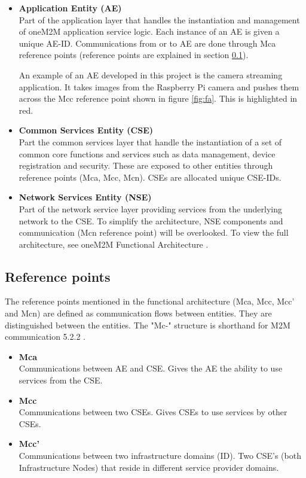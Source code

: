 \begin{itemize}
\item \textbf{Application Entity (AE)} \\Part of the application layer that handles the instantiation and management of oneM2M application service logic. Each instance of an AE is given a unique AE-ID. Communications from or to AE are done through Mca reference points (reference points are explained in section \ref{sec:rp}). 

An example of an AE developed in this project is the camera streaming application. It takes images from the Raspberry Pi camera and pushes them across the Mcc reference point shown in figure \ref{fig:fa}. This is highlighted in red.

\item \textbf{Common Services Entity (CSE)} \\Part the common services layer that handle the instantiation of a set of common core functions and services such as data management, device registration and security. These are exposed to other entities through reference points (Mca, Mcc, Mcn). CSEs are allocated unique CSE-IDs.    

\item \textbf{Network Services Entity (NSE)} \\Part of the network service layer providing services from the underlying network to the CSE. To simplify the architecture, NSE components and communication (Mcn reference point) will be overlooked. To view the full architecture, see oneM2M Functional Architecture \cite{oneM2M2016OneM2MArchitecture}.   
\end{itemize}

\subsection{Reference points}
\label{sec:rp}

The reference points mentioned in the functional architecture (Mca, Mcc, Mcc' and Mcn) are defined as communication flows between entities. They are distinguished between the entities. The "Mc-" structure is shorthand for M2M communication 5.2.2 \cite{oneM2M2016OneM2MArchitecture}. 

\begin{itemize}
  \item \textbf{Mca}\\ 
  Communications between AE and CSE. Gives the AE the ability to use services from the CSE. 
  \item \textbf{Mcc}\\ 
  Communications between two CSEs. Gives CSEs to use services by other CSEs.
  \item \textbf{Mcc'}\\ 
  Communications between two infrastructure domains (ID). Two CSE's (both Infrastructure Nodes) that reside in different service provider domains. 
\end{itemize}

